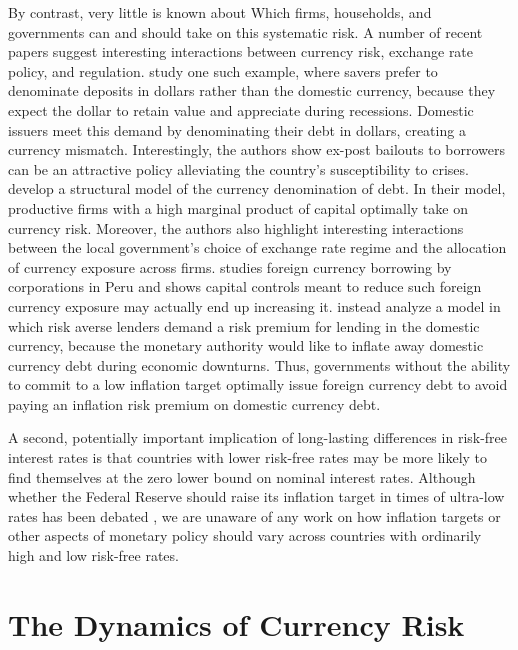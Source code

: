 \documentclass{ar-1col}
\begin{document}
By contrast, very little is known about Which firms, households, and governments can and should take on this systematic risk. A number of recent papers suggest interesting interactions between currency risk, exchange rate policy, and regulation. \citet{Bocola2019} study one such example, where savers prefer to denominate deposits in dollars rather than the domestic currency, because they expect the dollar to retain value and appreciate during recessions. Domestic issuers meet this demand by denominating their debt in dollars, creating a currency mismatch. Interestingly, the authors show ex-post bailouts to borrowers can be an attractive policy alleviating the country's susceptibility to crises. \citet{SalomaoVarela2019} develop a structural model of the currency denomination of debt. In their model, productive firms with a high marginal product of capital optimally take on currency risk. Moreover, the authors also highlight interesting interactions between the local government's choice of exchange rate regime and the allocation of currency exposure across firms. \cite{keller2019capital} studies foreign currency borrowing by corporations in Peru and shows capital controls meant to reduce such foreign currency exposure may actually end up increasing it. \citet{du2020sovereign} instead analyze a model in which risk averse lenders demand a risk premium for lending in the domestic currency, because the monetary authority would like to inflate away domestic currency debt during economic downturns. Thus, governments without the ability to commit to a low inflation target optimally issue foreign currency debt to avoid paying an inflation risk premium on domestic currency debt. 


A second, potentially important implication of long-lasting differences in risk-free interest rates is that countries with lower risk-free rates may be more likely to find themselves at the zero lower bound on nominal interest rates. Although whether the Federal Reserve should raise its inflation target in times of ultra-low rates has been debated \citep{coibion2012optimal,holston2017measuring,mertens2018expect}, we are unaware of any work on how inflation targets or other aspects of monetary policy should vary across countries with ordinarily high and low risk-free rates. 

\section{The Dynamics of Currency Risk\label{sec_dynamics}}
\end{document}
